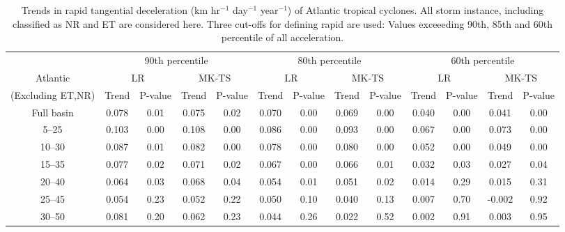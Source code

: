 \documentclass[wcd,manuscript]{copernicus}
\begin{document}
\begin{table*}[t]
  \caption{Trends in rapid tangential deceleration (km hr$^{-1}$ day$^{-1}$ year$^{-1}$) of Atlantic tropical cyclones. All storm instance, including classified as NR and ET are considered here. Three cut-offs for defining rapid are used: Values exceeeding 90th, 85th and 60th percentile of all acceleration. }

\begin{tabular}{|c|cccc|cccc|cccc|}
\hline
& \multicolumn{4}{|c|}{90th percentile} & \multicolumn{4}{|c|}{80th percentile }& \multicolumn{4}{|c|}{60th percentile}\\
Atlantic  & \multicolumn{2}{c}{LR} & \multicolumn{2}{c|}{MK-TS}& \multicolumn{2}{c}{LR} & \multicolumn{2}{c|}{MK-TS} & \multicolumn{2}{c}{LR} &  \multicolumn{2}{c|}{MK-TS}\\
(Excluding ET,NR) & Trend & P-value & Trend & P-value & Trend & P-value & Trend & P-value & Trend & P-value & Trend & P-value\\
\hline
Full basin &  0.078 & 0.01 &  0.075 & 0.02&  0.070 & 0.00 &  0.069 & 0.00 &  0.040 & 0.00 &  0.041 & 0.00\\
	  5--25 &  0.103 & 0.00 &  0.108 & 0.00 &  0.086 & 0.00 &  0.093 & 0.00 &  0.067 & 0.00 &  0.073 & 0.00\\
	 10--30 &  0.087 & 0.01 &  0.082 & 0.00 &  0.078 & 0.00 &  0.080 & 0.00 &  0.052 & 0.00 &  0.049 & 0.00\\
	 15--35 &  0.077 & 0.02 &  0.071 & 0.02 & 0.067  & 0.00 &  0.066 & 0.01 &  0.032 & 0.03 &  0.027 & 0.04\\
	 20--40 &  0.064 & 0.03 &  0.068 & 0.04 & 0.054  & 0.01 &  0.051 & 0.02 &  0.014 & 0.29 &  0.015 & 0.31\\
	 25--45 &  0.054 & 0.23 &  0.052 & 0.22 &  0.050 & 0.10 &  0.040 & 0.13 &  0.007 & 0.70 & -0.002 & 0.92\\
	 30--50 &  0.081 & 0.20 &  0.062 & 0.23 &  0.044 & 0.26 &  0.022 & 0.52 &  0.002 & 0.91 &  0.003 & 0.95\\
\hline
\hline
\end{tabular}
\label{tab:ATLAC}
\end{table*}


\end{document}
